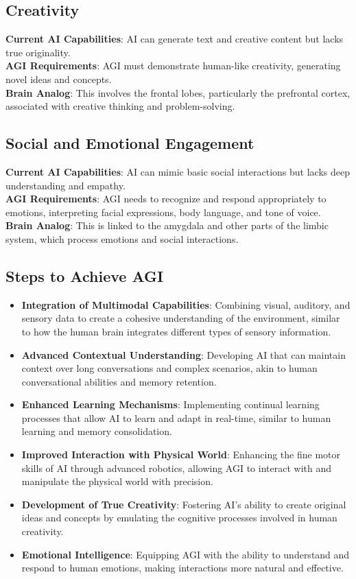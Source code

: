 \documentclass[a4paper,10.5pt]{article}
\begin{document}
\subsection{Creativity}
\textbf{Current AI Capabilities}: AI can generate text and creative content but lacks true originality. \\
\textbf{AGI Requirements}: AGI must demonstrate human-like creativity, generating novel ideas and concepts. \\
\textbf{Brain Analog}: This involves the frontal lobes, particularly the prefrontal cortex, associated with creative thinking and problem-solving.

\subsection{Social and Emotional Engagement}
\textbf{Current AI Capabilities}: AI can mimic basic social interactions but lacks deep understanding and empathy. \\
\textbf{AGI Requirements}: AGI needs to recognize and respond appropriately to emotions, interpreting facial expressions, body language, and tone of voice. \\
\textbf{Brain Analog}: This is linked to the amygdala and other parts of the limbic system, which process emotions and social interactions.

\subsection{Steps to Achieve AGI}
\begin{itemize}
    \item \textbf{Integration of Multimodal Capabilities}: Combining visual, auditory, and sensory data to create a cohesive understanding of the environment, similar to how the human brain integrates different types of sensory information.
    \item \textbf{Advanced Contextual Understanding}: Developing AI that can maintain context over long conversations and complex scenarios, akin to human conversational abilities and memory retention.
    \item \textbf{Enhanced Learning Mechanisms}: Implementing continual learning processes that allow AI to learn and adapt in real-time, similar to human learning and memory consolidation.
    \item \textbf{Improved Interaction with Physical World}: Enhancing the fine motor skills of AI through advanced robotics, allowing AGI to interact with and manipulate the physical world with precision.
    \item \textbf{Development of True Creativity}: Fostering AI's ability to create original ideas and concepts by emulating the cognitive processes involved in human creativity.
    \item \textbf{Emotional Intelligence}: Equipping AGI with the ability to understand and respond to human emotions, making interactions more natural and effective.
\end{itemize}
\end{document}
